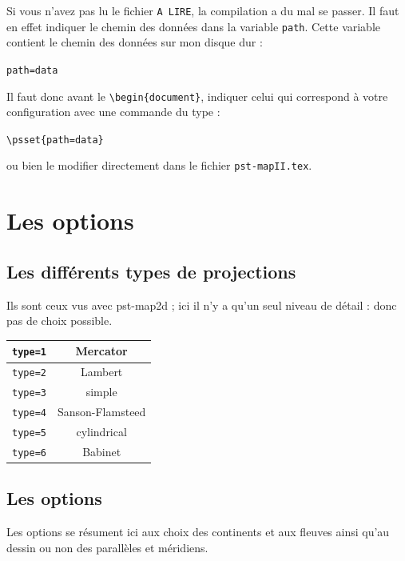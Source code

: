 \documentclass[11pt,french,BCOR10mm,DIV12,bibliography=totoc,parskip=false,
   smallheadings, headexclude,footexclude,oneside]{pst-doc}
\let\Parameter\texttt
\begin{document}
 Si vous
n'avez pas lu le fichier \verb+A LIRE+, la compilation a du mal se
passer. Il faut en effet indiquer le chemin des données dans la
variable \verb+path+. Cette variable contient le chemin des
données sur mon disque dur :

\verb+path=data+

Il faut donc avant le \verb+\begin{document}+, indiquer celui qui
correspond à votre configuration avec une commande du type :

\verb+\psset{path=data}+

 ou bien le modifier
directement dans le fichier \verb+pst-mapII.tex+.
\section{Les options}
\subsection{Les différents types de projections} Ils sont ceux
vus
avec \textsf{pst-map2d} ; ici il n'y a qu'un seul niveau de détail
: donc pas de choix possible.
\begin{center}
\renewcommand\arraystretch{2}
\begin{tabular}{|l|c|}\hline
\Parameter{type=1}& Mercator\\ \hline
\Parameter{type=2} & Lambert\\ \hline
\Parameter{type=3} & simple\\ \hline
\Parameter{type=4} & Sanson-Flamsteed\\ \hline
\Parameter{type=5} & cylindrical\\ \hline
\Parameter{type=6} & Babinet\\ \hline
\end{tabular}
\end{center}
\subsection{Les options}
Les options se résument ici aux choix des continents et aux fleuves  ainsi qu'au dessin ou non des parallèles et méridiens.
\end{document}
